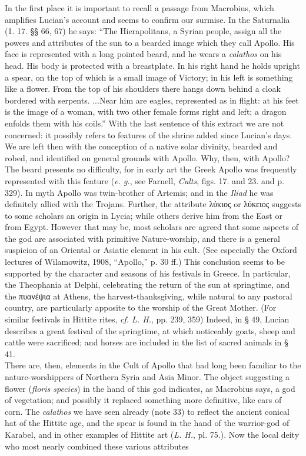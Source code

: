 \documentclass[a4paper, 11pt, oneside, polutonikogreek, english]{article}
\begin{document}
{In the first place it is important to recall a passage from Macrobius, which amplifies Lucian's account and seems to confirm our surmise. In the Saturnalia (1. 17. §§ 66, 67) he says: ``The Hierapolitans, a Syrian people, assign all the powers and attributes of the sun to a bearded image which they call Apollo. His face is represented with a long pointed beard, and he wears a \emph{calathos} on his head. His body is protected with a breastplate. In his right hand he holds upright a spear, on the top of which is a small image of Victory; in his left is something like a flower. From the top of his shoulders there hangs down behind a cloak bordered with serpents. ...Near him are eagles, represented as in flight: at his feet is the image of a woman, with two other female forms right and left; a dragon enfolds them with his coils.'' With the last sentence of this extract we are not concerned: it possibly refers to features of the shrine added since Lucian's days. We are left then with the conception of a native solar divinity, bearded and robed, and identified on general grounds with Apollo. Why, then, with Apollo?\\\hspace*{5mm}The beard presents no difficulty, for in early art the Greek Apollo was frequently represented with this feature (\emph{e. g.}, see Farnell, \emph{Cults}, figs. 17. and 23. and p. 329). In myth Apollo was twin-brother of Artemis; and in the \emph{Iliad} he was definitely allied with the Trojans. Further, the attribute λύκιος or λύκειος suggests to some scholars an origin in Lycia; while others derive him from the East or from Egypt. However that may be, most scholars are agreed that some aspects of the god are associated with primitive Nature-worship, and there is a general suspicion of an Oriental or Asiatic element in his cult. (See especially the Oxford lectures of Wilamowitz, 1908, ``Apollo,'' p. 30 ff.) This conclusion seems to be supported by the character and seasons of his festivals in Greece. In particular, the Theophania at Delphi, celebrating the return of the sun at springtime, and the πυανέψια at Athens, the harvest-thanksgiving, while natural to any pastoral country, are particularly apposite to the worship of the Great Mother. (For similar festivals in Hittite rites, \emph{cf. L. H.}, pp. 239, 359) Indeed, in § 49, Lucian describes a great festival of the springtime, at which noticeably goats, sheep and cattle were sacrificed; and horses are included in the list of sacred animals in § 41.\\\hspace*{5mm}There are, then, elements in the Cult of Apollo that had long been familiar to the nature-worshippers of Northern Syria and Asia Minor. The object suggesting a flower (\emph{floris species}) in the hand of this god indicates, as Macrobius says, a god of vegetation; and possibly it replaced something more definitive, like ears of corn. The \emph{calathos} we have seen already (note 33) to reflect the ancient conical hat of the Hittite age, and the spear is found in the hand of the warrior-god of Karabel, and in other examples of Hittite art (\emph{L. H.}, pl. 75.). Now the local deity who most nearly combined these various attributes }
\end{document}
